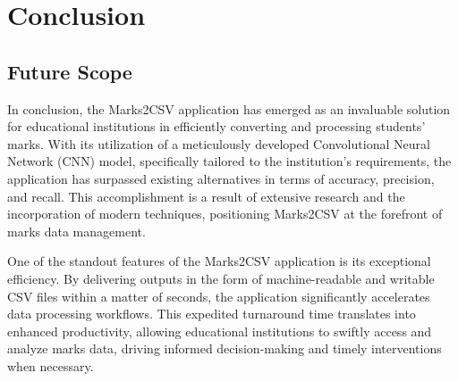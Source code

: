 \chapter{Conclusion}
\section{Future Scope}

In conclusion, the Marks2CSV application has emerged as an invaluable solution for educational institutions in efficiently converting and processing students' marks. With its utilization of a meticulously developed Convolutional Neural Network (CNN) model, specifically tailored to the institution's requirements, the application has surpassed existing alternatives in terms of accuracy, precision, and recall. This accomplishment is a result of extensive research and the incorporation of modern techniques, positioning Marks2CSV at the forefront of marks data management.

One of the standout features of the Marks2CSV application is its exceptional efficiency. By delivering outputs in the form of machine-readable and writable CSV files within a matter of seconds, the application significantly accelerates data processing workflows. This expedited turnaround time translates into enhanced productivity, allowing educational institutions to swiftly access and analyze marks data, driving informed decision-making and timely interventions when necessary.


